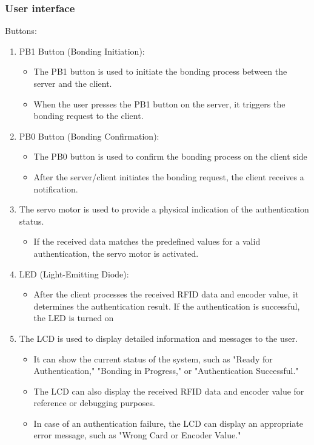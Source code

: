 \documentclass[a4paper,11pt]{article}%
\begin{document}

\subsubsection{User interface}

Buttons:
\begin{enumerate}
    \item PB1 Button (Bonding Initiation):
    \begin{itemize}
        \item The PB1 button is used to initiate the bonding process between the server and the client.
        \item When the user presses the PB1 button on the server, it triggers the bonding request to the client.
    \end{itemize}
    \item PB0 Button (Bonding Confirmation):
    \begin{itemize}
        \item The PB0 button is used to confirm the bonding process on the client side
        \item After the server/client initiates the bonding request, the client receives a notification.
    \end{itemize}
    \item The servo motor is used to provide a physical indication of the authentication status.
    \begin{itemize}
        \item If the received data matches the predefined values for a valid authentication, the servo motor is activated.
    \end{itemize}
    \item LED (Light-Emitting Diode):
    \begin{itemize}
        \item After the client processes the received RFID data and encoder value, it determines the authentication result.
        If the authentication is successful, the LED is turned on
    \end{itemize}
    \item The LCD is used to display detailed information and messages to the user.
    \begin{itemize}
        \item It can show the current status of the system, such as "Ready for Authentication," "Bonding in Progress," or "Authentication Successful."
        \item The LCD can also display the received RFID data and encoder value for reference or debugging purposes.
        \item In case of an authentication failure, the LCD can display an appropriate error message, such as "Wrong Card or Encoder Value."
    \end{itemize}
\end{enumerate}
\end{document}
